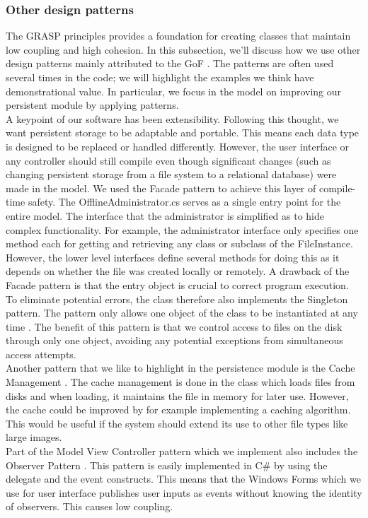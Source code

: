 \subsubsection{Other design patterns}
The GRASP principles provides a foundation for creating classes that maintain low coupling and high cohesion. In this subsection, we’ll discuss how we use other design patterns mainly attributed to the GoF \cite[p.~342]{OOAD}. The patterns are often used several times in the code; we will highlight the examples we think have demonstrational value. In particular, we focus in the model on improving our persistent module by applying patterns.\\
\newline
A keypoint of our software has been extensibility. Following this thought, we want persistent storage to be adaptable and portable. This means each data type is designed to be replaced or handled differently. However, the user interface or any controller should still compile even though significant changes (such as changing persistent storage from a file system to a relational database) were made in the model. We used the Facade pattern to achieve this layer of compile-time safety. The OfflineAdministrator.cs serves as a single entry point for the entire model. The interface that the administrator is simplified as to hide complex functionality. For example, the administrator interface only specifies one method each for getting and retrieving any class or subclass of the FileInstance. However, the lower level interfaces define several methods for doing this as it depends on whether the file was created locally or remotely. 
A drawback of the Facade pattern is that the entry object is crucial to correct program execution. To eliminate potential errors, the class therefore also implements the Singleton pattern. The pattern only allows one object of the class to be instantiated at any time \cite[p.~348]{OOAD}. The benefit of this pattern is that we control access to files on the disk through only one object, avoiding any potential exceptions from simultaneous access attempts. \\
\newline
Another pattern that we like to highlight in the persistence module is the Cache Management \cite[p.~551]{OOAD}. The cache management is done in the class which loads files from disks and when loading, it maintains the file in memory for later use. However, the cache could be improved by for example implementing a caching algorithm. This would be useful if the system should extend its use to other file types like large images.\\
\newline
Part of the Model View Controller pattern which we implement also includes the Observer Pattern \cite[p.~377]{OOAD}. This pattern is easily implemented in C\# by using the delegate and the event constructs. This means that the Windows Forms which we use for user interface publishes user inputs as events without knowing the identity of observers. This causes low coupling. \\
\newpage